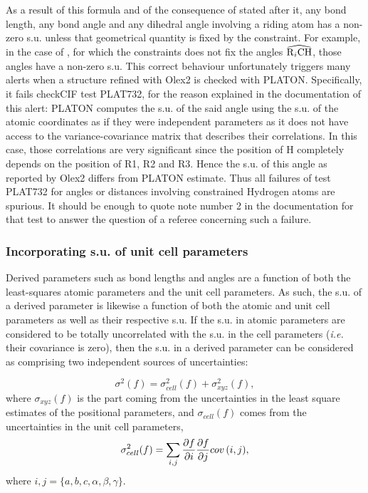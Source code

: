 \documentclass[pdf]{iucr}
\begin{document}
 As a result of this formula and of the consequence of  stated after it, any bond length, any bond angle and any dihedral angle involving a riding atom has a non-zero s.u. unless that geometrical quantity is fixed by the constraint. For example, in the case of , for which the constraints does not fix the angles $\widehat{\ce{R$_i$CH}}$, those angles have a non-zero s.u. This correct behaviour unfortunately triggers many alerts when a structure refined with Olex2 is checked with PLATON. Specifically, it fails checkCIF test PLAT732, for the reason explained in the documentation of this alert: PLATON computes the s.u. of the said angle using the s.u. of the atomic coordinates as if they were independent parameters as it does not have access to the variance-covariance matrix that describes their correlations. In this case, those correlations are very significant since the position of H completely depends on the position of R1, R2 and R3. Hence the s.u. of this angle as reported by Olex2 differs from PLATON estimate. Thus all failures of test PLAT732 for angles or distances involving constrained Hydrogen atoms are spurious. It should be enough to quote note number 2 in the documentation for that test to answer the question of a referee concerning such a failure.


\subsubsection{Incorporating s.u. of unit cell parameters}

Derived parameters such as bond lengths and angles are a function of both the least-squares atomic parameters and the unit cell parameters. As such, the s.u. of a derived parameter is likewise a function of both the atomic and unit cell parameters as well as their respective s.u. If the s.u. in atomic parameters are considered to be totally uncorrelated with the s.u. in the cell parameters (\emph{i.e.} their covariance is zero), then the s.u. in a derived parameter can be considered as comprising two independent sources of uncertainties:

\begin{equation}
\sigma^2(f) = \sigma^2_{cell}(f) + \sigma^2_{xyz}(f)
\label{eqn:sigma_d},
\end{equation}
where $\sigma_{xyz}(f)$ is the part coming from the uncertainties in the least square estimates of the positional parameters, and $\sigma_{cell}(f)$ comes from the uncertainties in the unit cell parameters,
\begin{equation}
\sigma^2_{cell}(f) = \sum_{i,j}{{\frac{\partial f}{\partial i}\frac{\partial f}{\partial j} cov\left(i,j\right)}}
\label{eqn:sigma_cell},
\end{equation}
where $i,j=\lbrace{a,b,c,\alpha,\beta,\gamma\rbrace}$.
\end{document}
